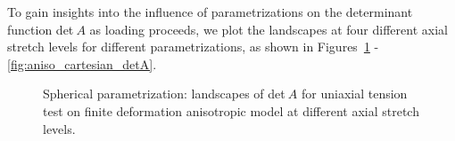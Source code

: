 \documentclass[12pt]{article}
\numberwithin{equation}{section}
\begin{document}
To gain insights into the influence of parametrizations on the
determinant function det$~A$ as loading proceeds, we plot the
landscapes at four different axial stretch levels for different
parametrizations, as shown in Figures~\ref{fig:aniso_spherical_detA} -
\ref{fig:aniso_cartesian_detA}.

\begin{figure}[H]
   \centering {}   
   \caption{Spherical parametrization: landscapes of det$~A$
   for uniaxial tension test on finite deformation anisotropic model at
   different axial stretch levels.}
   \label{fig:aniso_spherical_detA}
 \end{figure}
\end{document}
